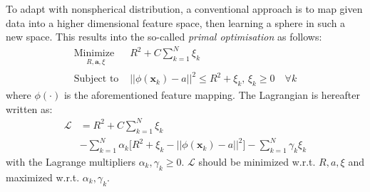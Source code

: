 \documentclass[conference]{IEEEtran}
\theoremstyle{problemstyle}
\begin{document}
To adapt with nonspherical distribution, a conventional approach is to map given data into a higher dimensional feature space, then learning a sphere in such a new space. This results into the so-called \emph{primal optimisation} as follows:
\begin{subequations}\label{eq:svm_primal}
\begin{align}
\underset{
	\begin{array}{c}
		 R, \mathbf{a}, \xi
	\end{array}}{\text{Minimize }} &R^2 + C \sum_{k=1}^N \xi_k \\
\text{Subject to } &\left|\left| \phi \left( \mathbf{x}_k \right) - a \right|\right|^2 \le R^2 + \xi_k \text{, } \xi_k \ge 0 \quad \forall k
\end{align}
\end{subequations}
where $\phi \left( \cdot \right)$ is the aforementioned feature mapping. The Lagrangian is hereafter written as:
\begin{align}
\mathcal{L} &= R^2 + C \sum_{k=1}^N \xi_k \nonumber \\&- \sum_{k=1}^N \alpha_k \bigg[ R^2 + \xi_k - \left|\left| \phi \left( \mathbf{x}_k \right) - a \right|\right|^2 \bigg] - \sum_{k=1}^N \gamma_k \xi_k \label{eq:svm_lagrange_init}
\end{align}
with the Lagrange multipliers $\alpha_k, \gamma_k \ge 0$. $\mathcal{L}$ should be minimized w.r.t. $R, a, \xi$ and maximized w.r.t. $\alpha_k, \gamma_k$.
\end{document}
